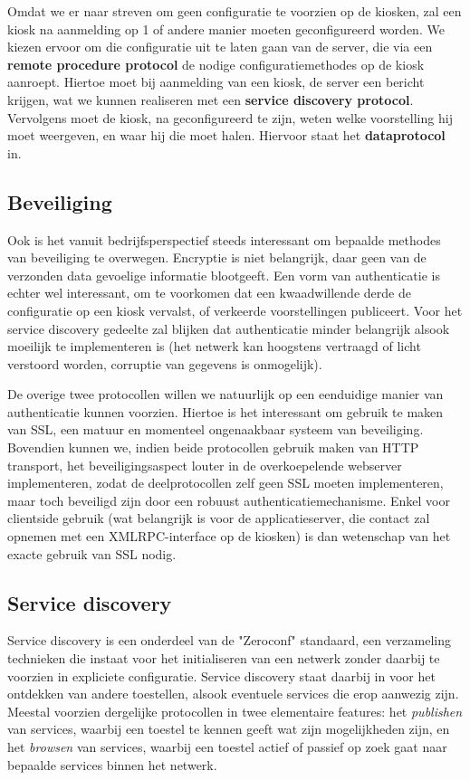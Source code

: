 Omdat we er naar streven om geen configuratie te voorzien op de kiosken, zal een kiosk na aanmelding op 1 of andere manier moeten geconfigureerd worden. We kiezen ervoor om die configuratie uit te laten gaan van de server, die via een \textbf{remote procedure protocol} de nodige configuratiemethodes op de kiosk aanroept. Hiertoe moet bij aanmelding van een kiosk, de server een bericht krijgen, wat we kunnen realiseren met een \textbf{service discovery protocol}. Vervolgens moet de kiosk, na geconfigureerd te zijn, weten welke voorstelling hij moet weergeven, en waar hij die moet halen. Hiervoor staat het \textbf{dataprotocol} in.

\subsection{Beveiliging}

Ook is het vanuit bedrijfsperspectief steeds interessant om bepaalde methodes van beveiliging te overwegen. Encryptie is niet belangrijk, daar geen van de verzonden data gevoelige informatie blootgeeft. Een vorm van authenticatie is echter wel interessant, om te voorkomen dat een kwaadwillende derde de configuratie op een kiosk vervalst, of verkeerde voorstellingen publiceert. Voor het service discovery gedeelte zal blijken dat authenticatie minder belangrijk alsook moeilijk te implementeren is (het netwerk kan hoogstens vertraagd of licht verstoord worden, corruptie van gegevens is onmogelijk).

De overige twee protocollen willen we natuurlijk op een eenduidige manier van authenticatie kunnen voorzien. Hiertoe is het interessant om gebruik te maken van SSL, een matuur en momenteel ongenaakbaar systeem van beveiliging. Bovendien kunnen we, indien beide protocollen gebruik maken van HTTP transport, het beveiligingsaspect louter in de overkoepelende webserver implementeren, zodat de deelprotocollen zelf geen SSL moeten implementeren, maar toch beveiligd zijn door een robuust authenticatiemechanisme. Enkel voor clientside gebruik (wat belangrijk is voor de applicatieserver, die contact zal opnemen met een XMLRPC-interface op de kiosken) is dan wetenschap van het exacte gebruik van SSL nodig.

\subsection{Service discovery}

Service discovery is een onderdeel van de "Zeroconf" standaard, een verzameling technieken die instaat voor het initialiseren van een netwerk zonder daarbij te voorzien in expliciete configuratie. Service discovery staat daarbij in voor het ontdekken van andere toestellen, alsook eventuele services die erop aanwezig zijn. Meestal voorzien dergelijke protocollen in twee elementaire features: het \emph{publishen} van services, waarbij een toestel te kennen geeft wat zijn mogelijkheden zijn, en het \emph{browsen} van services, waarbij een toestel actief of passief op zoek gaat naar bepaalde services binnen het netwerk.

